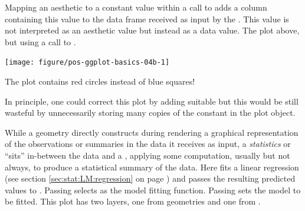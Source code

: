 \documentclass[krantz2]{krantz}\usepackage{knitr}
\begin{document}
\begin{warningbox}
Mapping an aesthetic to a constant value within a call to  adds a column containing this value to the data frame received as input by the . This value is not interpreted as an aesthetic value but instead as a data value. The plot above, but using a call to .

\begin{knitrout}\footnotesize
{}\color{fgcolor}\begin{kframe}
\begin{alltt}
\hlstd{(} 
        \hlstd{=} \hlstd{(}    \hlopt{+}
  \hlstd{(} \hlstd{=} \hlstd{(} \hlstd{=} \hlstd{,}  \hlstd{=} \hlstd{))}
\end{alltt}
\end{kframe}

{\centering \texttt{[image: figure/pos-ggplot-basics-04b-1]} 

}


\end{knitrout}

The plot contains red circles instead of blue squares!

In principle, one could correct this plot by adding suitable  but this would be still wasteful by unnecessarily storing many copies of the constant  in the  plot object.
\end{warningbox}

While a geometry directly constructs during rendering a graphical representation of the observations or summaries in the data it receives as input, a \emph{statistics} or  ``sits'' in-between the data and a , applying some computation, usually but not always, to produce a statistical summary of the data. Here  fits a linear regression (see section \ref{sec:stat:LM:regression} on page \pageref{sec:stat:LM:regression}) and passes the resulting predicted values to . Passing  selects  as the model fitting function. Passing  sets the model to be fitted. This plot has two layers, one from geometries  and one from .%
\end{document}
